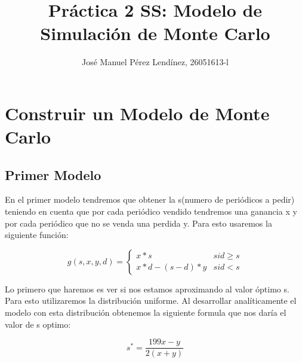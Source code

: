 \documentclass[]{article}
\title{Práctica 2 SS: Modelo de Simulación de Monte Carlo}
\author{José Manuel Pérez Lendínez, 26051613-l}
\begin{document}
	
	\maketitle
	
	
	\newpage
	\tableofcontents
	\newpage
	
\section{Construir un Modelo de Monte Carlo}
\subsection{Primer Modelo}

En el primer modelo tendremos que obtener la s(numero de periódicos a pedir) teniendo en cuenta que por cada periódico vendido tendremos una ganancia x y por cada periódico que no se venda una perdida y.  Para esto usaremos la siguiente función:


$$g(s, x, y, d)=\left\{\begin{array}{ll}{x * s} & { { si } d \geq s} \\ {x * d-(s-d) * y} & { { si } d<s}\end{array}\right.$$


Lo primero que haremos es ver si nos estamos aproximando al valor óptimo s. Para esto utilizaremos la distribución uniforme. Al desarrollar analíticamente el modelo con esta distribución obtenemos la siguiente formula que nos daría el valor de s optimo:

$$s^{*}=\frac{199 x-y}{2(x+y)}$$
\end{document}
